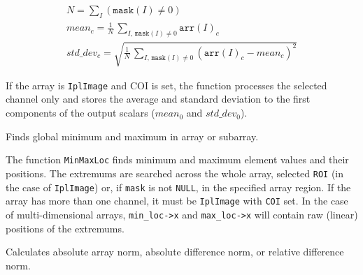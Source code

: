 \[
\begin{array}{l}
N = \sum_I (\texttt{mask}(I) \ne 0)\\
mean_c = \frac{1}{N} \, \sum_{ I, \, \texttt{mask}(I) \ne 0} \texttt{arr}(I)_c\\
std\_dev_c = \sqrt{\frac{1}{N} \, \sum_{ I, \, \texttt{mask}(I) \ne 0} (\texttt{arr}(I)_c - mean_c)^2}
\end{array}
\]

If the array is \texttt{IplImage} and COI is set, the function processes the selected channel only and stores the average and standard deviation to the first components of the output scalars ($mean_0$ and $std\_dev_0$).

\label{MinMaxLoc}

Finds global minimum and maximum in array or subarray.


\begin{description}
\end{description}

The function \texttt{MinMaxLoc} finds minimum and maximum element values
and their positions. The extremums are searched across the whole array,
selected \texttt{ROI} (in the case of \texttt{IplImage}) or, if \texttt{mask}
is not \texttt{NULL}, in the specified array region. If the array has
more than one channel, it must be \texttt{IplImage} with \texttt{COI}
set. In the case of multi-dimensional arrays, \texttt{min\_loc->x} and \texttt{max\_loc->x}
will contain raw (linear) positions of the extremums.

\label{Norm}

Calculates absolute array norm, absolute difference norm, or relative difference norm.


